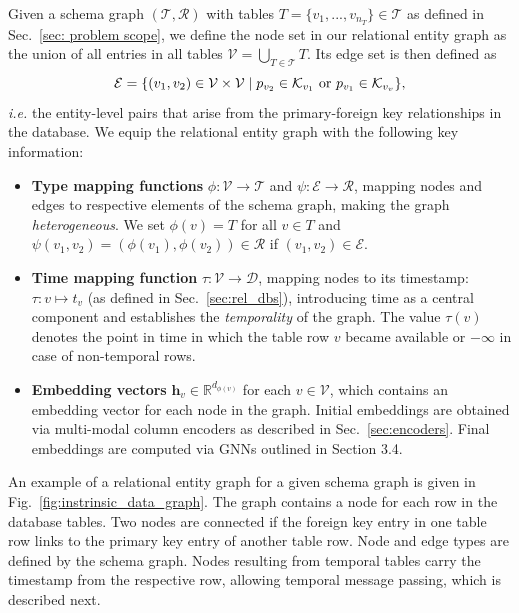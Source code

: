 Given a schema graph $(\mathcal{T}, \mathcal{R})$ with tables $T = \{v_1, ..., v_{n_T}\}\in\mathcal{T}$ as defined in Sec.~\ref{sec: problem scope}, we define the node set in our relational entity graph as the union of all entries in all tables $\mathcal{V} = \bigcup_{T\in\mathcal{T}}T$.
Its edge set is then defined as
\begin{equation}
\mathcal{E} = \{(v_1, v_2) \in \mathcal{V} \times \mathcal{V} \mid  p_{v_2} \in \mathcal{K}_{v_1} \text{ or } p_{v_1} \in \mathcal{K}_{v_v}\}\textnormal{,}
\end{equation}
\emph{i.e.} the entity-level pairs that arise from the primary-foreign key relationships in the database. 
We equip the relational entity graph with the following key information:
\begin{itemize}
    \item \textbf{Type mapping functions} $\phi: \mathcal{V} \rightarrow \mathcal{T}$ and $\psi: \mathcal{E} \rightarrow \mathcal{R}$, mapping nodes and edges to respective elements of the schema graph, making the graph \emph{heterogeneous}. We set $\phi(v) = T$ for all $v\in T$ and $\psi(v_1,v_2) = (\phi(v_1), \phi(v_2)) \in \mathcal R$ if $(v_1,v_2) \in \mathcal E$.
    \item \textbf{Time mapping function} $\tau: \mathcal{V} \rightarrow \mathcal{D}$, mapping nodes to its timestamp: $\tau: v \mapsto t_v$ (as defined in Sec.~\ref{sec:rel_dbs}), introducing time as a central component and establishes the \emph{temporality} of the graph. The value $\tau(v)$ denotes the point in time in which the table row $v$ became available or $-\infty$ in case of non-temporal rows.
    \item \textbf{Embedding vectors} $\mathbf{h}_v \in \mathbb{R}^{d_{\phi(v)}}$ for each $v\in\mathcal{V}$, which contains an embedding vector for each node in the graph. Initial embeddings are obtained via multi-modal column encoders as described in Sec.~\ref{sec:encoders}. Final embeddings are computed via GNNs outlined in Section 3.4.
\end{itemize}

An example of a relational entity graph for a given schema graph is given in Fig.~\ref{fig:instrinsic_data_graph}.
The graph contains a node for each row in the database tables. Two nodes are connected if the foreign key entry in one table row links to the primary key entry of another table row. Node and edge types are defined by the schema graph. Nodes resulting from temporal tables carry the timestamp from the respective row, allowing temporal message passing, which is described next.



